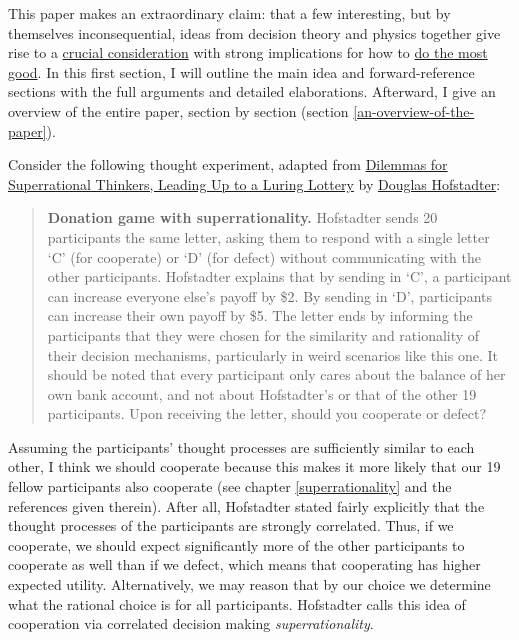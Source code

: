 This paper makes an extraordinary claim: that a few interesting, but by
themselves inconsequential, ideas from decision theory and physics
together give rise to a
\href{https://concepts.effectivealtruism.org/concepts/the-importance-of-crucial-considerations/}{crucial
consideration} with strong implications for how to
\href{https://en.wikipedia.org/wiki/Effective_altruism}{do the
most good}. In this first section, I will outline the main idea and
forward-reference sections with the full arguments and detailed
elaborations. Afterward, I give an overview of the entire paper, section
by section (section
\ref{an-overview-of-the-paper}).

Consider the following thought experiment, adapted from
\href{https://www.gwern.net/docs/1985-hofstadter\#dilemmas-for-superrational-thinkers-leading-up-to-a-luring-lottery}{Dilemmas
for Superrational Thinkers, Leading Up to a Luring Lottery} by
\href{https://en.wikipedia.org/wiki/Douglas_Hofstadter}{Douglas
Hofstadter}:

\begin{quote}
\textbf{Donation game with superrationality.} Hofstadter sends 20
participants the same letter, asking them to respond with a single
letter `C' (for cooperate) or `D' (for defect) without communicating
with the other participants. Hofstadter explains that by sending in `C',
a participant can increase everyone else's payoff by \$2. By sending in
`D', participants can increase their own payoff by \$5. The letter ends
by informing the participants that they were chosen for the similarity
and rationality of their decision mechanisms, particularly in weird
scenarios like this one. It should be noted that every participant only
cares about the balance of her own bank account, and not about
Hofstadter's or that of the other 19 participants. Upon receiving the
letter, should you cooperate or defect?
\end{quote}

Assuming the participants' thought processes are sufficiently similar to
each other, I think we should cooperate because this makes it more
likely that our 19 fellow participants also cooperate (see chapter
\ref{superrationality} and
the references given therein). After all, Hofstadter stated fairly
explicitly that the thought processes of the participants are strongly
correlated. Thus, if we cooperate, we should expect significantly more
of the other participants to cooperate as well than if we defect, which
means that cooperating has higher expected utility. Alternatively, we
may reason that by our choice we determine what the rational choice is
for all participants. Hofstadter calls this idea of cooperation via
correlated decision making \emph{superrationality}.

